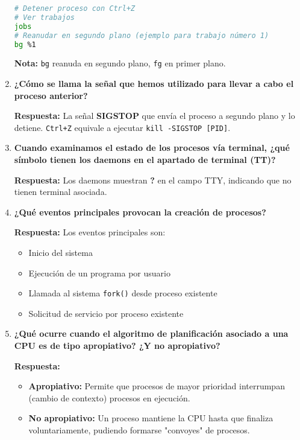 \documentclass[a4paper,12pt]{article}
\begin{document}
\begin{enumerate}[label=\textbf{Pregunta \arabic*.},left=0pt,itemsep=1.5em]
\begin{lstlisting}[language=bash]
# Detener proceso con Ctrl+Z
# Ver trabajos
jobs
# Reanudar en segundo plano (ejemplo para trabajo número 1)
bg %1
\end{lstlisting}

\textbf{Nota:} \texttt{bg} reanuda en segundo plano, \texttt{fg} en primer plano.

\item \textbf{¿Cómo se llama la señal que hemos utilizado para llevar a cabo el proceso anterior?}

\textbf{Respuesta:} La señal \textbf{SIGSTOP} que envía el proceso a segundo plano y lo detiene. \texttt{Ctrl+Z} equivale a ejecutar \texttt{kill -SIGSTOP [PID]}.

\item \textbf{Cuando examinamos el estado de los procesos vía terminal, ¿qué símbolo tienen los daemons en el apartado de terminal (TT)?}

\textbf{Respuesta:} Los daemons muestran \textbf{?} en el campo TTY, indicando que no tienen terminal asociada.

\item \textbf{¿Qué eventos principales provocan la creación de procesos?}

\textbf{Respuesta:} Los eventos principales son:
\begin{itemize}
    \item Inicio del sistema
    \item Ejecución de un programa por usuario
    \item Llamada al sistema \texttt{fork()} desde proceso existente
    \item Solicitud de servicio por proceso existente
\end{itemize}

\item \textbf{¿Qué ocurre cuando el algoritmo de planificación asociado a una CPU es de tipo apropiativo? ¿Y no apropiativo?}

\textbf{Respuesta:}
\begin{itemize}
    \item \textbf{Apropiativo:} Permite que procesos de mayor prioridad interrumpan (cambio de contexto) procesos en ejecución.
    \item \textbf{No apropiativo:} Un proceso mantiene la CPU hasta que finaliza voluntariamente, pudiendo formarse "convoyes" de procesos.
\end{itemize}


\end{enumerate}
\end{document}
